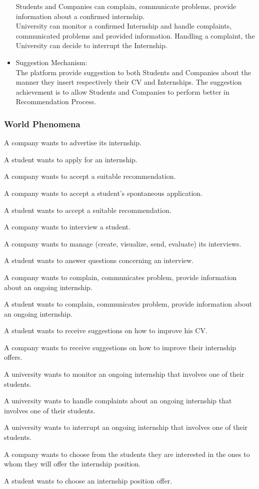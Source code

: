 \begin{itemize}
    Students and Companies can complain, communicate problems, provide information about a confirmed internship.\\
    University can monitor a confirmed Internship and handle complaints, communicated problems and provided information.
    Handling a complaint, the University can decide to interrupt the Internship.
\item {\color{titleColor}Suggestion Mechanism:}\\
    The platform provide suggestion to both Students and Companies about the manner they insert respectively their CV and Internships. The suggestion achievement is to allow Students and Companies to perform better in Recommendation Process.
\end{itemize}

\subsubsection{World Phenomena}
\begin{enumerate}[label={\color{titleColor}[WP\arabic*]}]
\item A company wants to advertise its internship.
\item A student wants to apply for an internship.
\item A company wants to accept a suitable recommendation.
\item A company wants to accept a student's spontaneous application.
\item A student wants to accept a suitable recommendation.
\item A company wants to interview a student.
\item A company wants to manage (create, visualize, send, evaluate) its interviews.
\item A student wants to answer questions concerning an interview.
\item A company wants to complain, communicates problem, provide information about an ongoing internship.
\item A student wants to complain, communicates problem, provide information about an ongoing internship.
\item A student wants to receive suggestions on how to improve his CV.
\item A company wants to receive suggestions on how to improve their internship offers.
\item A university wants to monitor an ongoing internship that involves one of their students.
\item A university wants to handle complaints about an ongoing internship that involves one of their students.
\item A university wants to interrupt an ongoing internship that involves one of their students.
\item A company wants to choose from the students they are interested in the ones to whom they will offer the internship position.
\item A student wants to choose an internship position offer.

\end{enumerate}
